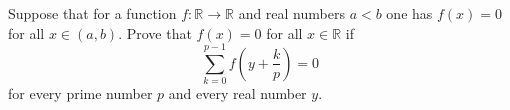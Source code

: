 Suppose that for a function \(f\colon  \mathbb{R}\to \mathbb{R}\) and real numbers \(a<b\) one has \(f(x)=0\) for all \(x\in (a,b).\) Prove that \(f(x)=0\) for all \(x\in \mathbb{R}\) if
\[\sum^{p-1}_{k=0}f\left(y+\frac{k}{p}\right)=0\]
for every prime number \(p\) and every real number \(y.\)